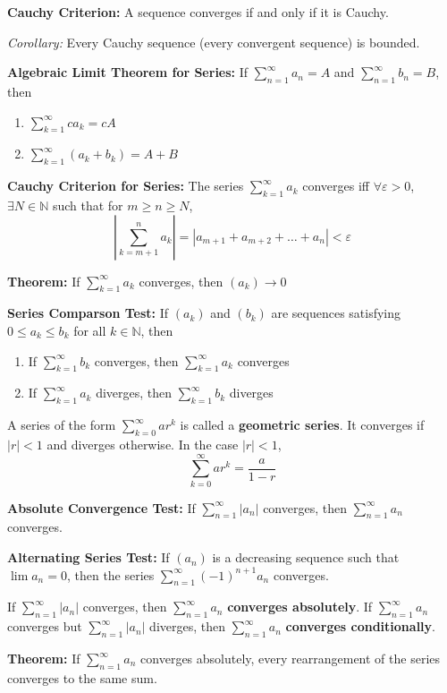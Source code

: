 \documentclass[12pt]{article}
\newcommand{\N}{\mathbb{N}}
\newcommand{\abs}[1]{\left\vert #1 \right\vert}
\newcommand{\ep}{\varepsilon}
\begin{document}
\textbf{Cauchy Criterion:} A sequence converges if and only if it is Cauchy. 

\emph{Corollary:} Every Cauchy sequence (every convergent sequence) is bounded.

\textbf{Algebraic Limit Theorem for Series:} If $\sum_{n=1}^{\infty} a_n = A$ and $\sum_{n=1}^{\infty} b_n = B$, then
\begin{enumerate}
    \item $\sum_{k=1}^{\infty} ca_k = cA$ 
    \item $\sum_{k=1}^{\infty} (a_k + b_k) = A + B$
\end{enumerate}

\textbf{Cauchy Criterion for Series:} The series $\sum_{k=1}^{\infty} a_k$ converges iff $\forall \ep > 0$, $\exists N \in \N$ such that for $m \geq n \geq N$,
\[\abs{\sum_{k=m+1}^n a_k} = \abs{a_{m+1} + a_{m+2} + \dots + a_n} < \ep\]

\textbf{Theorem:} If $\sum_{k=1}^{\infty} a_k$ converges, then $(a_k)\to 0$ 

\textbf{Series Comparson Test:} If $(a_k)$ and $(b_k)$ are sequences satisfying $0 \leq a_k \leq b_k$ for all $k \in \N$, then
\begin{enumerate}
    \item If $\sum_{k=1}^{\infty} b_k$ converges, then $\sum_{k=1}^{\infty} a_k$ converges
    \item If $\sum_{k=1}^{\infty} a_k$ diverges, then $\sum_{k=1}^{\infty} b_k$ diverges
\end{enumerate}

A series of the form $\sum_{k=0}^{\infty} ar^k$ is called a \textbf{geometric series}. It converges if $\abs{r} < 1$ and diverges otherwise. In the case $\abs{r} < 1$, 
\[\sum_{k=0}^{\infty} ar^k = \frac{a}{1- r}\]

\textbf{Absolute Convergence Test:} If $\sum_{n=1}^{\infty} \abs{a_n}$ converges, then $\sum_{n=1}^{\infty} a_n$ converges. 

\textbf{Alternating Series Test:} If $(a_n)$ is a decreasing sequence such that $\lim a_n = 0$, then the series $\sum_{n=1}^{\infty} (-1)^{n+1}a_n$ converges.

If $\sum_{n=1}^{\infty} \abs{a_n}$ converges, then $\sum_{n=1}^{\infty} a_n$ \textbf{converges absolutely}. If $\sum_{n=1}^{\infty} a_n$ converges but $\sum_{n=1}^{\infty} \abs{a_n}$ diverges, then $\sum_{n=1}^{\infty} a_n$ \textbf{converges conditionally}.

\textbf{Theorem:} If $\sum_{n=1}^{\infty} a_n$ converges absolutely, every rearrangement of the series converges to the same sum.
\end{document}
